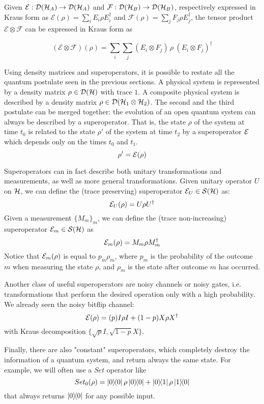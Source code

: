 Given $\mathcal{E}: \mathcal{D}(\mathcal{H}_A) \rightarrow \mathcal{D}(\mathcal{H}_A)$ and $\mathcal{F}: \mathcal{D}(\mathcal{H}_B) \rightarrow \mathcal{D}(\mathcal{H}_B)$,
respectively expressed in Kraus form as $\mathcal{E}(\rho) = \sum_i E_i \rho E_i^\dag$ and $\mathcal{F}(\rho) = \sum_j F_j \rho E_j^\dag$, the tensor product $\mathcal{E} \otimes \mathcal{F}$
can be expressed in Kraus form as 

\[
  (\mathcal{E} \otimes \mathcal{F})(\rho) = \sum_i \sum_j (E_i \otimes F_j)\,\rho\:(E_i \otimes F_j)^\dag
\]


Using density matrices and superoperators, it is possible to restate all the quantum postulate seen in the previous sections. A physical system is represented by a density matrix $\rho \in \mathcal{D}(\mathcal{H})$ with trace $1$. A composite physical  system is described by a density matrix $\rho \in \mathcal{D}(\mathcal{H}_1 \otimes \mathcal{H}_2)$. The second and the third postulate can be merged together: the evolution of an open quantum system can always be described by a superoperator. That is, the state $\rho$ of the system at time $t_0$ is related to the state $\rho'$ of the system at time $t_2$ by a superoperator $\mathcal{E}$ which depends only on the times $t_0$ and $t_1$.
\[
	\rho' = \mathcal{E}(\rho)
\]



Superoperators can in fact describe both unitary transformations and measurements, as well as more general transformations. Given unitary operator $U$ on $\mathcal{H}$, we can define  the (trace preserving) superoperator $\mathcal{E}_U \in \mathcal{S}(\mathcal{H})$ as:
\[ \mathcal{E}_U(\rho) = U \rho U^\dagger\]
Given a measurement $\{M_m\}_m$, we can define the (trace non-increasing) superoperator $\mathcal{E}_m \in \mathcal{S}(\mathcal{H})$ as 
\[\mathcal{E}_m(\rho) = M_m\rho M_m^\dagger\]
Notice that $\mathcal{E}_m(\rho)$ is equal to $p_m\rho_m$, where $p_m$ is the probability of the outcome $m$ when measuring the state $\rho$, and $\rho_m$ is the state after outcome $m$ has occurred. 


Another class of useful superoperators are noisy channels or noisy gates, i.e. transformations that perform the desired operation only with a high probability. We already seen the noisy bitflip channel: 
\[\mathcal{E}(\rho) = (p) 
I\rho I
+
(1-p)
X \rho X^\dagger
\]
with Kraus decomposition $\{\sqrt{p}I, \sqrt{1-p}X\}$.


Finally, there are also "constant" superoperators, which completely destroy the information of a quantum system, and return always the same state. For example, we will often use a $ Set$ operator like
\[Set_0(\rho) = \proj{0}\rho\proj{0} + \ketbra{0}{1}\rho\ketbra{1}{0}\]
that always returns $\ket{0}\!\!\bra{0}$ for any possible input.